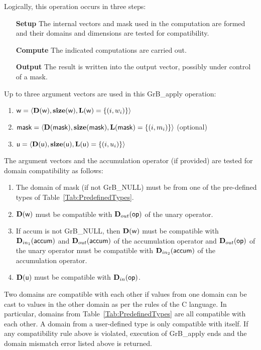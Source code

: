 Logically, this operation occurs in three steps:
\begin{enumerate}[leftmargin=0.75in]
\item[\bf Setup] The internal vectors and mask used in the computation are formed 
and their domains and dimensions are tested for compatibility.
\item[\bf Compute] The indicated computations are carried out.
\item[\bf Output] The result is written into the output vector, possibly under 
control of a mask.
\end{enumerate}

Up to three argument vectors are used in this {\sf GrB\_apply} operation:
\begin{enumerate}
	\item ${\sf w} = \langle \bold{D}({\sf w}),\bold{size}({\sf w}),
    \bold{L}({\sf w}) = \{(i,w_i) \} \rangle$

	\item ${\sf mask} = \langle \bold{D}({\sf mask}),\bold{size}({\sf mask}),
    \bold{L}({\sf mask}) = \{(i,m_i) \} \rangle$ (optional)

	\item ${\sf u} = \langle \bold{D}({\sf u}),\bold{size}({\sf u}),
    \bold{L}({\sf u}) = \{(i,u_i) \} \rangle$
\end{enumerate}

The argument vectors and the accumulation 
operator (if provided) are tested for domain compatibility as follows:
\begin{enumerate}
	\item The domain of {\sf mask} (if not {\sf GrB\_NULL}) must be from one of 
    the pre-defined types of Table~\ref{Tab:PredefinedTypes}.

	\item $\bold{D}({\sf w})$ must be 
    compatible with $\mbox{$\mathbf{D}_{out}$}({\sf op})$ of the unary operator.

	\item If {\sf accum} is not {\sf GrB\_NULL}, then $\bold{D}({\sf w})$ must be
    compatible with $\mbox{$\mathbf{D}_{in_{1}}$}({\sf accum})$ and $\mbox{$\mathbf{D}_{out}$}({\sf accum})$ of the accumulation operator and 
    $\mbox{$\mathbf{D}_{out}$}({\sf op})$ of the unary operator must be compatible with $\mbox{$\mathbf{D}_{in_{2}}$}({\sf accum})$ of the accumulation operator.

	\item $\bold{D}({\sf u})$ must be compatible with $\mbox{$\mathbf{D}_{in}$}({\sf op})$.
\end{enumerate}
Two domains are compatible with each other if values from one domain can be cast 
to values in the other domain as per the rules of the C language.
In particular, domains from Table~\ref{Tab:PredefinedTypes} are all compatible 
with each other. A domain from a user-defined type is only compatible with itself.
If any compatibility rule above is violated, execution of {\sf GrB\_apply} ends
and the domain mismatch error listed above is returned.

